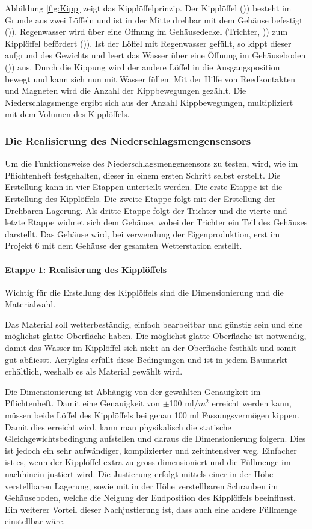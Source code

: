 Abbildung \ref{fig:Kipp} zeigt das Kipplöffelprinzip. Der Kipplöffel ()\grqq) besteht im Grunde aus zwei Löffeln und ist in der Mitte drehbar mit dem Gehäuse befestigt ()\grqq). Regenwasser wird über eine Öffnung im Gehäusedeckel (Trichter, )\grqq) zum Kipplöffel befördert ()\grqq). Ist der Löffel mit Regenwasser gefüllt, so kippt dieser aufgrund des Gewichts und leert das Wasser über eine Öffnung im Gehäuseboden ()\grqq) aus. Durch die Kippung wird der andere Löffel in die Ausgangsposition bewegt und kann sich nun mit Wasser füllen. Mit der Hilfe von Reedkontakten und Magneten wird die Anzahl der Kippbewegungen gezählt. Die Niederschlagsmenge ergibt sich aus der Anzahl Kippbewegungen, multipliziert mit dem Volumen des Kipplöffels.
\newpage

\subsubsection*{Die Realisierung des Niederschlagsmengensensors}
Um die Funktionsweise des Niederschlagsmengensensors  zu testen, wird, wie im Pflichtenheft festgehalten, dieser in einem ersten Schritt selbst erstellt. Die Erstellung kann in vier Etappen unterteilt werden. Die erste Etappe ist die Erstellung des Kipplöffels. Die zweite Etappe folgt mit der Erstellung der Drehbaren Lagerung. Als dritte Etappe folgt der Trichter und die vierte und letzte Etappe widmet sich dem Gehäuse, wobei der Trichter ein Teil des Gehäuses darstellt. Das Gehäuse wird, bei verwendung der Eigenproduktion, erst im Projekt 6 mit dem Gehäuse der gesamten Wetterstation erstellt.
\paragraph{Etappe 1: Realisierung des Kipplöffels}
Wichtig für die Erstellung des Kipplöffels sind die Dimensionierung und die Materialwahl.
 
Das Material soll wetterbeständig, einfach bearbeitbar und günstig sein und eine möglichst glatte Oberfläche haben. Die möglichst glatte Oberfläche ist notwendig, damit das Wasser im Kipplöffel sich nicht an der Oberfläche festhält und somit gut abfliesst. Acrylglas erfüllt diese Bedingungen und ist in jedem Baumarkt erhältlich, weshalb es als Material gewählt wird.

Die Dimensionierung ist Abhängig von der gewählten Genauigkeit im Pflichtenheft. Damit eine Genauigkeit von $\pm$100 ml/$m^2$ erreicht werden kann, müssen beide Löffel des Kipplöffels bei genau 100 ml Fassungsvermögen kippen. Damit dies erreicht wird, kann man physikalisch die statische Gleichgewichtsbedingung aufstellen und daraus die Dimensionierung folgern. Dies ist jedoch ein sehr aufwändiger, komplizierter und zeitintensiver weg. Einfacher ist es, wenn der Kipplöffel extra zu gross dimensioniert und die Füllmenge im nachhinein justiert wird. Die Justierung erfolgt mittels einer in der Höhe verstellbaren Lagerung, sowie mit in der Höhe verstellbaren Schrauben im Gehäuseboden, welche die Neigung der Endposition des Kipplöffels beeinflusst. Ein weiterer Vorteil dieser Nachjustierung ist, dass auch eine andere Füllmenge einstellbar wäre.

